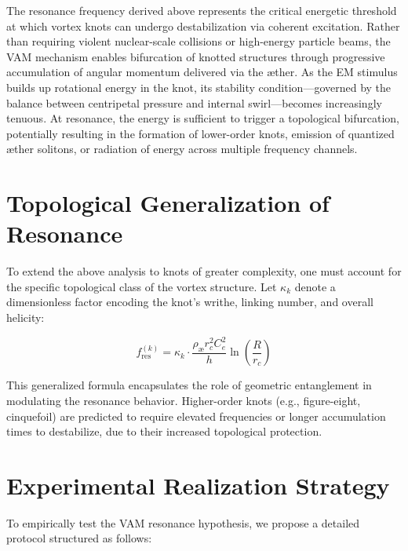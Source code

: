 \documentclass[a4paper, aps,preprint,superscriptaddress, 12pt]{revtex4}
\begin{document}
The resonance frequency derived above represents the critical energetic threshold at which vortex knots can undergo destabilization via coherent excitation. Rather than requiring violent nuclear-scale collisions or high-energy particle beams, the VAM mechanism enables bifurcation of knotted structures through progressive accumulation of angular momentum delivered via the \ae{}ther. As the EM stimulus builds up rotational energy in the knot, its stability condition—governed by the balance between centripetal pressure and internal swirl—becomes increasingly tenuous. At resonance, the energy is sufficient to trigger a topological bifurcation, potentially resulting in the formation of lower-order knots, emission of quantized \ae{}ther solitons, or radiation of energy across multiple frequency channels.


\section{Topological Generalization of Resonance}

To extend the above analysis to knots of greater complexity, one must account for the specific topological class of the vortex structure. Let $\kappa_k$ denote a dimensionless factor encoding the knot's writhe, linking number, and overall helicity:

\begin{equation}
f_\text{res}^{(k)} = \kappa_k \cdot \frac{\rho_\text{\ae} r_c^2 C_e^2}{h} \ln\left(\frac{R}{r_c}\right)
\end{equation}

This generalized formula encapsulates the role of geometric entanglement in modulating the resonance behavior. Higher-order knots (e.g., figure-eight, cinquefoil) are predicted to require elevated frequencies or longer accumulation times to destabilize, due to their increased topological protection.

\section{Experimental Realization Strategy}

To empirically test the VAM resonance hypothesis, we propose a detailed protocol structured as follows:
\end{document}
